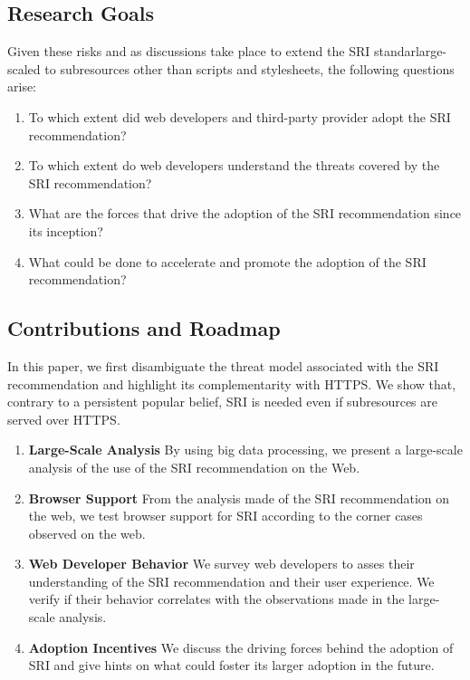 \documentclass[sigconf,table]{acmart}
\begin{document}
\cite{eden_major_2018}

\subsection{Research Goals}

Given these risks and as discussions take place to extend the SRI standarlarge-scaled to subresources other than scripts and stylesheets, the following questions arise:

\begin{enumerate}
	\item To which extent did web developers and third-party provider adopt the SRI recommendation?
	\item To which extent do web developers understand the threats covered by the SRI recommendation?
	\item What are the forces that drive the adoption of the SRI recommendation since its inception?
	\item What could be done to accelerate and promote the adoption of the SRI recommendation?
\end{enumerate}

\subsection{Contributions and Roadmap}

In this paper, we first disambiguate the threat model associated with the SRI recommendation and highlight its complementarity with HTTPS.
We show that, contrary to a persistent popular belief, SRI is needed even if subresources are served over HTTPS. 

\begin{enumerate}
	\item \textbf{Large-Scale Analysis}
		By using big data processing, we present a large-scale analysis of the use of the SRI recommendation on the Web.
	\item \textbf{Browser Support}
		From the analysis made of the SRI recommendation on the web, we test browser support for SRI according to the corner cases observed on the web. 
	\item \textbf{Web Developer Behavior}
		We survey web developers to asses their understanding of the SRI recommendation and their user experience.
		We verify if their behavior correlates with the observations made in the large-scale analysis.
	\item \textbf{Adoption Incentives}
		 We discuss the driving forces behind the adoption of SRI and give hints on what could foster its larger adoption in the future.
\end{enumerate}
\end{document}
